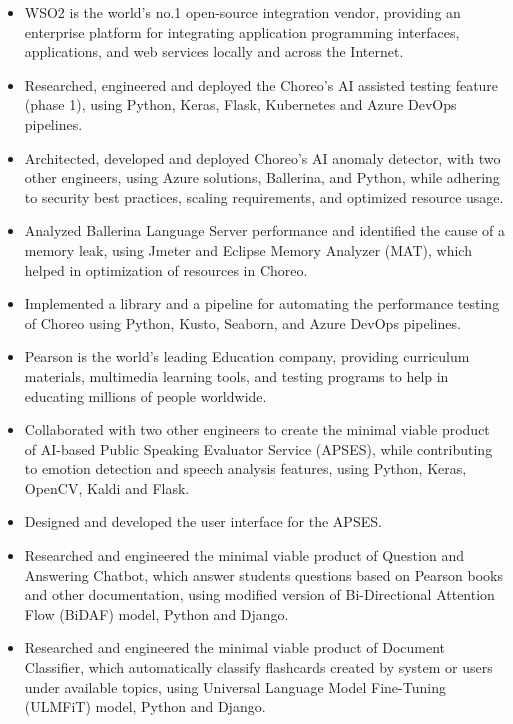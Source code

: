 \documentclass[10pt,a4paper,ragged2e,withhyper]{altacv}
\begin{document}
\begin{itemize}
    \item WSO2 is the world's no.1 open-source integration vendor, providing an enterprise platform for integrating application programming interfaces, applications, and web services locally and across the Internet.
    \item Researched, engineered and deployed the Choreo's AI assisted testing feature (phase 1), using Python, Keras, Flask, Kubernetes and Azure DevOps pipelines.
    \item Architected, developed and deployed Choreo's AI anomaly detector, with two other engineers, using Azure solutions, Ballerina, and Python, while adhering to security best practices, scaling requirements, and optimized resource usage.
    \item Analyzed Ballerina Language Server performance and identified the cause of a memory leak, using Jmeter and Eclipse Memory Analyzer (MAT), which helped in optimization of resources in Choreo.
    \item Implemented a library and a pipeline for automating the performance testing of Choreo using Python, Kusto, Seaborn, and Azure DevOps pipelines.
\end{itemize}

\divider{}

\begin{itemize}
    \item Pearson is the world's leading Education company, providing curriculum materials, multimedia learning tools, and testing programs to help in educating millions of people worldwide.
    \item Collaborated with two other engineers to create the minimal viable product of AI-based Public Speaking Evaluator Service (APSES), while contributing to emotion detection and speech analysis features, using Python, Keras, OpenCV, Kaldi and Flask.
    \item Designed and developed the user interface for the APSES.
    \item Researched and engineered the minimal viable product of Question and Answering Chatbot, which answer students questions based on Pearson books and other documentation, using modified version of Bi-Directional Attention Flow (BiDAF) model, Python and Django.
    \item Researched and engineered the minimal viable product of Document Classifier, which automatically classify flashcards created by system or users under available topics, using Universal Language Model Fine-Tuning (ULMFiT) model, Python and Django.
\end{itemize}
\end{document}
